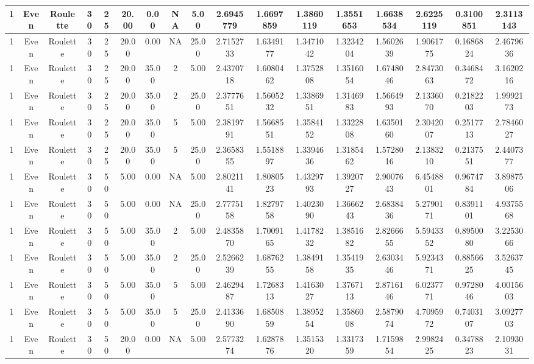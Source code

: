\documentclass[a4paper]{article}
\begin{document}
\begin{center}
\begin{tabular}{ | c | c | c | c | c | c | c | c | c | c | c | c | c | c | c | c | c | }
		\hline
		1	&	Even	&	Roulette	&	30	&	25	&	20.00	&	0.00	&	NA	&	5.00	&	2.6945779	&	1.6697859	&	1.3860119	&	1.3551653	&	1.6638534	&	2.6225119	&	0.3100851	&	2.3113143 \\
		\hline
		1	&	Even	&	Roulette	&	30	&	25	&	20.00	&	0.00	&	NA	&	25.00	&	2.7152733	&	1.6349177	&	1.3471042	&	1.3234204	&	1.5602639	&	1.9061775	&	0.1686824	&	2.4679636 \\
		\hline
		1	&	Even	&	Roulette	&	30	&	25	&	20.00	&	35.00	&	2	&	5.00	&	2.4370718	&	1.6080462	&	1.3752808	&	1.3516054	&	1.6748046	&	2.8473063	&	0.3468472	&	3.1620216 \\
		\hline
		1	&	Even	&	Roulette	&	30	&	25	&	20.00	&	35.00	&	2	&	25.00	&	2.3777651	&	1.5605232	&	1.3386951	&	1.3146983	&	1.5664993	&	2.1336070	&	0.2182203	&	1.9992173 \\
		\hline
		1	&	Even	&	Roulette	&	30	&	25	&	20.00	&	35.00	&	5	&	5.00	&	2.3819791	&	1.5668551	&	1.3584152	&	1.3322808	&	1.6350160	&	2.3042007	&	0.2517713	&	2.7846027 \\
		\hline
		1	&	Even	&	Roulette	&	30	&	25	&	20.00	&	35.00	&	5	&	25.00	&	2.3658355	&	1.5518897	&	1.3394636	&	1.3185462	&	1.5728016	&	2.1383210	&	0.2137551	&	2.4407377 \\
		\hline
		1	&	Even	&	Roulette	&	30	&	50	&	5.00	&	0.00	&	NA	&	5.00	&	2.8021141	&	1.8080523	&	1.4329793	&	1.3920727	&	2.9007643	&	6.4548801	&	0.9674784	&	3.8987506 \\
		\hline
		1	&	Even	&	Roulette	&	30	&	50	&	5.00	&	0.00	&	NA	&	25.00	&	2.7775158	&	1.8279758	&	1.4023090	&	1.3666243	&	2.6838436	&	5.2790171	&	0.8391101	&	4.9375568 \\
		\hline
		1	&	Even	&	Roulette	&	30	&	50	&	5.00	&	35.00	&	2	&	5.00	&	2.4835870	&	1.7009165	&	1.4178232	&	1.3851682	&	2.8266655	&	5.5943352	&	0.8950080	&	3.2253066 \\
		\hline
		1	&	Even	&	Roulette	&	30	&	50	&	5.00	&	35.00	&	2	&	25.00	&	2.5266239	&	1.6876255	&	1.3849158	&	1.3541935	&	2.6303446	&	5.9234371	&	0.8856625	&	3.5263745 \\
		\hline
		1	&	Even	&	Roulette	&	30	&	50	&	5.00	&	35.00	&	5	&	5.00	&	2.4629487	&	1.7268313	&	1.4163027	&	1.3767113	&	2.8716146	&	6.0237771	&	0.9728046	&	4.0015603 \\
		\hline
		1	&	Even	&	Roulette	&	30	&	50	&	5.00	&	35.00	&	5	&	25.00	&	2.4133690	&	1.6850859	&	1.3895254	&	1.3586008	&	2.5879074	&	4.7095972	&	0.7403107	&	3.0927703 \\
		\hline
		1	&	Even	&	Roulette	&	30	&	50	&	20.00	&	0.00	&	NA	&	5.00	&	2.5773274	&	1.6287876	&	1.3515320	&	1.3317359	&	1.7159854	&	2.9982425	&	0.3478823	&	2.1093031 \\

\end{tabular}
\end{center}
\end{document}
